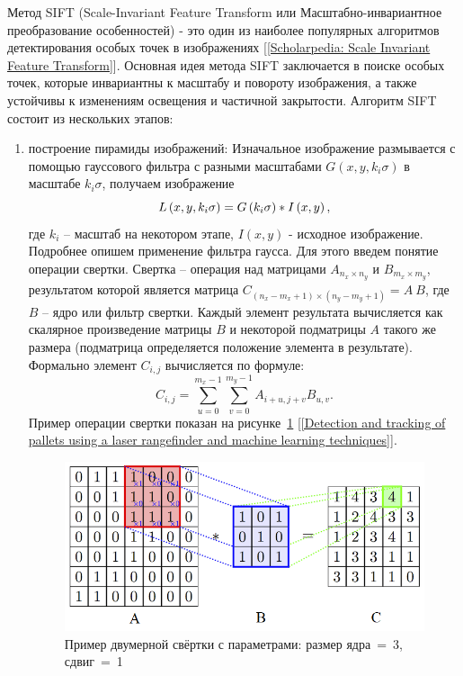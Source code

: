 \documentclass[14pt, a4paper]{extreport}
\begin{document}
	Метод SIFT (Scale-Invariant Feature Transform или Масштабно-\linebreak инвариантное преобразование особенностей) - это один из наиболее популярных алгоритмов детектирования особых точек в изображениях [\ref{Scholarpedia: Scale Invariant Feature Transform}]. Основная идея метода SIFT заключается в поиске особых точек, которые инвариантны к масштабу и повороту изображения, а также устойчивы к изменениям освещения и частичной закрытости. Алгоритм SIFT состоит из нескольких этапов:
	\begin{enumerate}[label={\arabic*)}]
	\item построение пирамиды изображений: Изначальное изображение размывается с помощью гауссового фильтра с разными масштабами $G\left(x,y,k_i\sigma \right)$ в масштабе $k_i\sigma$, получаем изображение 
	\vspace*{-0.2cm}
	\begin{equation*}
		L\left(x,y,k_i\sigma \right)=G\left(k_i\sigma \right)*I\left(x,y\right), 
		\label{L(x,y,sigma)}
		\vspace*{-0.4cm}
	\end{equation*}
	где $k_i$ -- масштаб на некотором этапе, $I\left(x,y\right)$ - исходное изображение. 
	Подробнее опишем применение фильтра гаусса. Для этого введем понятие операции свертки. Свертка -- операция над матрицами $A_{n_x \times n_y}$ и $B_{m_x \times m_y}$, результатом которой является матрица $C_{(n_x - m_x + 1)\times(n_y - m_y + 1)}=A~B$, где $B$ -- ядро или фильтр свертки. Каждый элемент результата вычисляется как скалярное произведение матрицы $B$ и некоторой подматрицы $A$ такого же размера (подматрица определяется положение элемента в результате). Формально элемент $C_{i,j}$ вычисляется по формуле: 
	\begin{equation*}
		C_{i, j} = \sum_{u=0}^{m_x - 1} \sum_{v = 0}^{m_y - 1} A_{i+u, j+v}B_{u, v}. 
		\label{eq:Cij1}
	\end{equation*}
	Пример операции свертки показан на рисунке~\ref{fig:conv} [\ref{Detection and tracking of pallets using a laser rangefinder and machine learning techniques}].
	\begin{figure}[ht!]
		\centering
		\includegraphics[width=\textwidth]{image/chapter_2/conv-example.png}
		\caption{Пример двумерной свёртки с параметрами: размер ядра~=~3, сдвиг~=~1}
		\label{fig:conv}
	\end{figure}


\end{enumerate}
\end{document}
